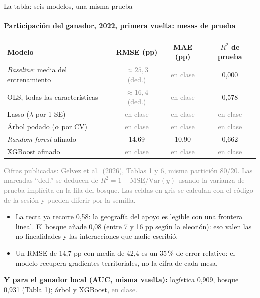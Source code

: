 \documentclass{beamer}
\newcommand{\Var}{\mathrm{Var}}
\newcommand{\1}{\mathbb{I}}
\newcommand{\MSE}{\mathrm{MSE}}
\begin{document}
\begin{frame}{La tabla: seis modelos, una misma prueba}
\framesubtitle{Participación del ganador, 2022, primera vuelta: mesas de prueba}
\small
\begin{center}
\footnotesize
\setlength{\tabcolsep}{5pt}
\begin{tabular}{lccc}
\hline
Modelo & RMSE (pp) & MAE (pp) & $R^2$ de prueba \\
\hline
\emph{Baseline}: media del entrenamiento & \textcolor{gray}{$\approx 25{,}3$ (ded.)} & \textcolor{gray}{en clase} & 0,000 \\
OLS, todas las características & \textcolor{gray}{$\approx 16{,}4$ (ded.)} & \textcolor{gray}{en clase} & 0,578 \\
Lasso ($\lambda$ por 1-SE) & \textcolor{gray}{en clase} & \textcolor{gray}{en clase} & \textcolor{gray}{en clase} \\
Árbol podado ($\alpha$ por CV) & \textcolor{gray}{en clase} & \textcolor{gray}{en clase} & \textcolor{gray}{en clase} \\
\emph{Random forest} afinado & 14,69 & 10,90 & 0,662 \\
XGBoost afinado & \textcolor{gray}{en clase} & \textcolor{gray}{en clase} & \textcolor{gray}{en clase} \\
\hline
\end{tabular}
\end{center}
{\scriptsize\textcolor{gray}{Cifras publicadas: Gelvez et al.\ (2026), Tablas 1 y 6, misma partición 80/20. Las marcadas ``ded.'' se deducen de $R^2 = 1 - \MSE/\Var(y)$ usando la varianza de prueba implícita en la fila del bosque. Las celdas en gris se calculan con el código de la sesión y pueden diferir por la semilla.}}
\pause
\vspace{0.05cm}
\begin{itemize}\itemsep2pt
  \item La recta ya recorre 0,58: la geografía del apoyo es legible con una frontera lineal. El bosque añade 0,08 (entre 7 y 16 pp según la elección): eso valen las no linealidades y las interacciones que nadie escribió. \pause
  \item Un RMSE de 14,7 pp con media de 42,4 es un 35\,\% de error relativo: el modelo recupera gradientes territoriales, no la cifra de cada mesa.
\end{itemize}
\pause
\vspace{0.05cm}
\textbf{Y para el ganador local (AUC, misma vuelta):} logística 0,909, bosque 0,931 (Tabla 1); árbol y XGBoost, \textcolor{gray}{en clase}.
\end{frame}
\end{document}
